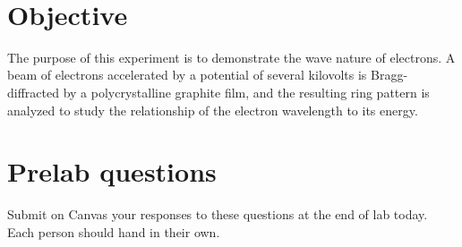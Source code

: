 \documentclass{tufte-handout}
\begin{document}



\vspace{0.5cm}
\\
\vspace{0.5cm}


\section{Objective}

The purpose of this experiment is to demonstrate the wave nature of electrons. A
beam of electrons accelerated by a potential of several kilovolts is
Bragg-diffracted by a polycrystalline graphite film, and the resulting ring
pattern is analyzed to study the relationship of the electron wavelength to its
energy.

\section{Prelab questions}

Submit on Canvas your responses to these questions at the end of lab today. Each person should hand in their own.
\end{document}
